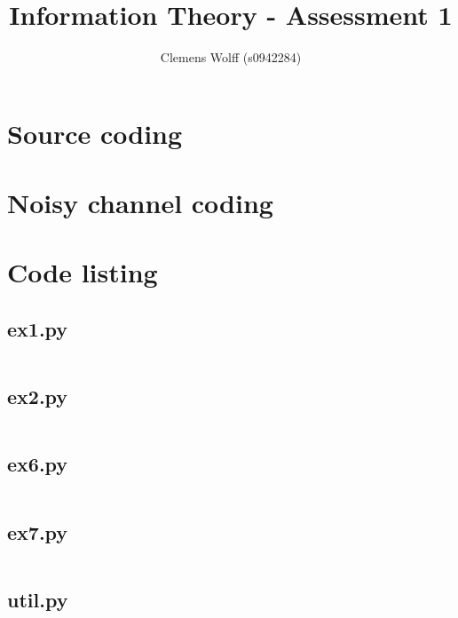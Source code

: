\documentclass[a4paper,twoside,twocolumn]{article}
\date{\vspace{-2em}}
\title{Information Theory - Assessment 1}
\author{Clemens Wolff (s0942284)}
\renewcommand\thesection{Part \arabic{section}:\xspace}
\begin{document}
\maketitle

\section{Source coding}

\section{Noisy channel coding}

\onecolumn
\appendixpage
\appendix
\renewcommand\thesection{Appendix \arabic{section}:\xspace}

\section{Code listing}
\renewcommand\thesubsection{File:\xspace}

\subsection{ex1.py}
\inputminted{python}{../src/ex1.py}

\subsection{ex2.py}
\inputminted{python}{../src/ex2.py}

\subsection{ex6.py}
\inputminted{python}{../src/ex6.py}

\subsection{ex7.py}
\inputminted{python}{../src/ex7.py}

\subsection{util.py}
\inputminted{python}{../src/util.py}
\end{document}
